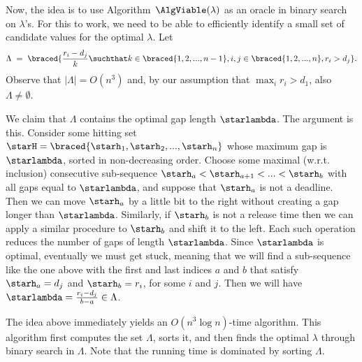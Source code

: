 \medskip

Now, the idea is to use Algorithm~$\AlgViable(\lambda)$ as an oracle in binary search on $\lambda$'s. 
For this to work, we need to be able to efficiently identify a small set of candidate values for the optimal $\lambda$. Let 
\begin{equation*}
	\Lambda \;=\; \braced{ \frac{r_i - d_j}{k} \suchthat k\in \braced{1,2,..., n-1} , i,j\in\braced{1,2,...,n} , r_i > d_j}.
\end{equation*}
Observe that $|\Lambda| = O(n^3)$ and, by our assumption that $\max_i r_i > d_1$, also $\Lambda \neq \emptyset$.

We claim that $\Lambda$ contains the optimal gap length $\starlambda$. The argument is this. 
Consider some hitting set $\starH = \braced{\starh_1,\starh_2,...,\starh_n}$ whose maximum gap is $\starlambda$, 
sorted in non-decreasing order. Choose some maximal (w.r.t. inclusion)
consecutive sub-sequence $\starh_a < \starh_{a+1} < ... < \starh_b$ 
with all gaps equal to $\starlambda$, and suppose that $\starh_a$ is not a deadline. 
Then we can move $\starh_a$ by a little bit to the right without creating a gap
longer than $\starlambda$. Similarly, if $\starh_b$ is not a release time then
we can apply a similar procedure to $\starh_b$ and shift it to the left.
Each such operation reduces the number of gaps of length $\starlambda$. Since $\starlambda$ is optimal,
eventually we must get stuck, meaning that we will find a sub-sequence like the one above with the first
and last indices $a$ and $b$ that satisfy $\starh_a  = d_j$ and $\starh_b  = r_i$, for some $i$ and $j$.
Then we will have $\starlambda = \frac{r_i - d_j}{b-a} \in \Lambda$.

The idea above immediately yields an $O(n^3\log n)$-time algorithm. This algorithm
first computes the set $\Lambda$, sorts it, and then finds the optimal $\lambda$
through binary search in $\Lambda$. Note that the running time is dominated by sorting $\Lambda$. 

\smallskip

